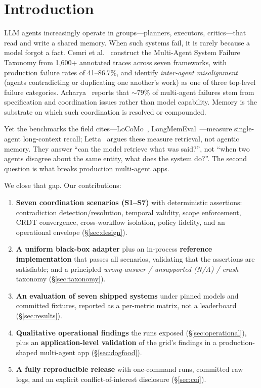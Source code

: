 \documentclass[11pt]{article}
\begin{document}
\section{Introduction}
LLM agents increasingly operate in groups---planners, executors, critics---that read
and write a shared memory. When such systems fail, it is rarely because a model
forgot a fact. Cemri et al.~\cite{cemri2025mast} construct the Multi-Agent System
Failure Taxonomy from 1{,}600+ annotated traces across seven frameworks, with
production failure rates of 41--86.7\%, and identify \emph{inter-agent misalignment}
(agents contradicting or duplicating one another's work) as one of three top-level
failure categories. Acharya~\cite{acharya2026semconsensus} reports that ${\sim}79\%$
of multi-agent failures stem from specification and coordination issues rather than
model capability. Memory is the substrate on which such coordination is resolved or
compounded.

Yet the benchmarks the field cites---LoCoMo~\cite{maharana2024locomo},
LongMemEval~\cite{wu2025longmemeval}---measure single-agent long-context recall;
Letta~\cite{letta2025locomo} argues these measure retrieval, not agentic memory.
They answer ``can the model retrieve what was said?'', not ``when two agents disagree
about the same entity, what does the system do?''. The second question is what breaks
production multi-agent apps.

We close that gap. Our contributions:
\begin{enumerate}
  \item \textbf{Seven coordination scenarios (S1--S7)} with deterministic assertions:
  contradiction detection/resolution, temporal validity, scope enforcement, CRDT
  convergence, cross-workflow isolation, policy fidelity, and an operational envelope
  (\S\ref{sec:design}).
  \item \textbf{A uniform black-box adapter} plus an in-process \textbf{reference
  implementation} that passes all scenarios, validating that the assertions are
  satisfiable; and a principled \emph{wrong-answer / unsupported (N/A) / crash}
  taxonomy (\S\ref{sec:taxonomy}).
  \item \textbf{An evaluation of seven shipped systems} under pinned models and
  committed fixtures, reported as a per-metric matrix, not a leaderboard
  (\S\ref{sec:results}).
  \item \textbf{Qualitative operational findings} the runs exposed
  (\S\ref{sec:operational}), plus an \textbf{application-level validation} of the
  grid's findings in a production-shaped multi-agent app (\S\ref{sec:dogfood}).
  \item \textbf{A fully reproducible release} with one-command runs, committed raw
  logs, and an explicit conflict-of-interest disclosure (\S\ref{sec:coi}).
\end{enumerate}
\end{document}
